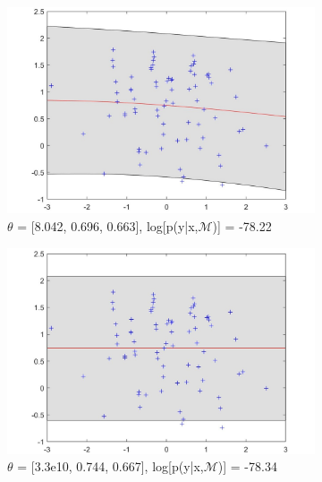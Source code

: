 \documentclass[twoside,twocolumn]{article}
\begin{document}
\begin{figure}[h]
\centering
    \begin{subfigure}[t]{0.49\linewidth}
        \centering
        \includegraphics[width=\textwidth]{c_1_2_1_graph}
        \caption{\textbf{$\theta$} = [8.042, 0.696, 0.663], log[p(y|x,$\mathcal{M}$)] = -78.22}
        \label{sub:hyp1}
    \end{subfigure}%
    \begin{subfigure}[t]{0.49\linewidth}
        \centering
        \includegraphics[width=\textwidth]{c_1_2_3_graph}
        \caption{\textbf{$\theta$} = [3.3e10, 0.744, 0.667], log[p(y|x,$\mathcal{M}$)] = -78.34}
        \label{sub:hyp2}
    \end{subfigure}%
    \newline
    \begin{subfigure}[t]{0.49\linewidth}
        \centering

\end{subfigure}
\end{figure}
\end{document}
